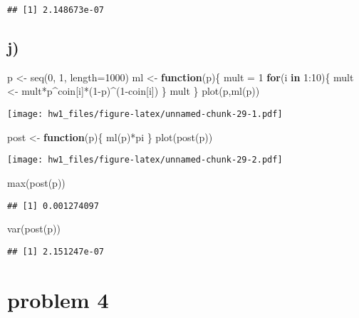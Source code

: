 \documentclass[
]{article}
\newenvironment{Shaded}{\begin{snugshade}}{\end{snugshade}}
\newcommand{\AttributeTok}[1]{\textcolor[rgb]{0.77,0.63,0.00}{#1}}
\newcommand{\ControlFlowTok}[1]{\textcolor[rgb]{0.13,0.29,0.53}{\textbf{#1}}}
\newcommand{\DecValTok}[1]{\textcolor[rgb]{0.00,0.00,0.81}{#1}}
\newcommand{\FunctionTok}[1]{\textcolor[rgb]{0.00,0.00,0.00}{#1}}
\newcommand{\NormalTok}[1]{#1}
\newcommand{\OtherTok}[1]{\textcolor[rgb]{0.56,0.35,0.01}{#1}}
\newcommand{\SpecialCharTok}[1]{\textcolor[rgb]{0.00,0.00,0.00}{#1}}
\begin{document}
\begin{verbatim}
## [1] 2.148673e-07
\end{verbatim}

\hypertarget{j-1}{%
\subsection{j)}\label{j-1}}

\begin{Shaded}
\begin{Highlighting}[]
\NormalTok{p }\OtherTok{\textless{}{-}} \FunctionTok{seq}\NormalTok{(}\DecValTok{0}\NormalTok{, }\DecValTok{1}\NormalTok{, }\AttributeTok{length=}\DecValTok{1000}\NormalTok{)}
\NormalTok{ml }\OtherTok{\textless{}{-}} \ControlFlowTok{function}\NormalTok{(p)\{}
\NormalTok{  mult }\OtherTok{=} \DecValTok{1} 
  \ControlFlowTok{for}\NormalTok{(i }\ControlFlowTok{in} \DecValTok{1}\SpecialCharTok{:}\DecValTok{10}\NormalTok{)\{}
\NormalTok{    mult }\OtherTok{\textless{}{-}}\NormalTok{ mult}\SpecialCharTok{*}\NormalTok{p}\SpecialCharTok{\^{}}\NormalTok{coin[i]}\SpecialCharTok{*}\NormalTok{(}\DecValTok{1}\SpecialCharTok{{-}}\NormalTok{p)}\SpecialCharTok{\^{}}\NormalTok{(}\DecValTok{1}\SpecialCharTok{{-}}\NormalTok{coin[i])}
\NormalTok{  \}}
\NormalTok{  mult}
\NormalTok{\}}
\FunctionTok{plot}\NormalTok{(p,}\FunctionTok{ml}\NormalTok{(p))}
\end{Highlighting}
\end{Shaded}

\texttt{[image: hw1\_files/figure-latex/unnamed-chunk-29-1.pdf]}

\begin{Shaded}
\begin{Highlighting}[]
\NormalTok{post }\OtherTok{\textless{}{-}} \ControlFlowTok{function}\NormalTok{(p)\{}
  \FunctionTok{ml}\NormalTok{(p)}\SpecialCharTok{*}\NormalTok{pi}
\NormalTok{\}}
\FunctionTok{plot}\NormalTok{(}\FunctionTok{post}\NormalTok{(p))}
\end{Highlighting}
\end{Shaded}

\texttt{[image: hw1\_files/figure-latex/unnamed-chunk-29-2.pdf]}

\begin{Shaded}
\begin{Highlighting}[]
\FunctionTok{max}\NormalTok{(}\FunctionTok{post}\NormalTok{(p))}
\end{Highlighting}
\end{Shaded}

\begin{verbatim}
## [1] 0.001274097
\end{verbatim}

\begin{Shaded}
\begin{Highlighting}[]
\FunctionTok{var}\NormalTok{(}\FunctionTok{post}\NormalTok{(p))}
\end{Highlighting}
\end{Shaded}

\begin{verbatim}
## [1] 2.151247e-07
\end{verbatim}

\hypertarget{problem-4}{%
\section{problem 4}\label{problem-4}}
\end{document}
